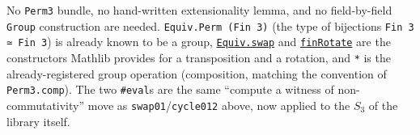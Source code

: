 No \texttt{Perm3} bundle, no hand-written extensionality lemma, and no field-by-field \texttt{Group} construction are needed. \texttt{Equiv.Perm (Fin 3)} (the type of bijections \texttt{Fin 3 ≃ Fin 3}) is already known to be a group, \href{https://loogle.lean-lang.org/?q=Equiv.swap}{\texttt{Equiv.swap}} and \href{https://loogle.lean-lang.org/?q=finRotate}{\texttt{finRotate}} are the constructors Mathlib provides for a transposition and a rotation, and \texttt{*} is the already-registered group operation (composition, matching the convention of \texttt{Perm3.comp}). The two \texttt{\#eval}s are the same ``compute a witness of non-commutativity'' move as \texttt{swap01}/\texttt{cycle012} above, now applied to the \(S_3\) of the library itself.

